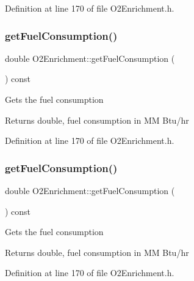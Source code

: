 Definition at line 170 of file O2\+Enrichment.\+h.

\mbox{\label{class_o2_enrichment_a48d73aca893ac689880b1d10faa399a5}} 
\subsubsection{\texorpdfstring{get\+Fuel\+Consumption()}{getFuelConsumption()}\hspace{0.1cm}{\footnotesize\ttfamily [2/3]}}
{\footnotesize\ttfamily double O2\+Enrichment\+::get\+Fuel\+Consumption (\begin{DoxyParamCaption}{ }\end{DoxyParamCaption}) const\hspace{0.3cm}{\ttfamily [inline]}}

Gets the fuel consumption \begin{DoxyReturn}{Returns}
double, fuel consumption in MM Btu/hr 
\end{DoxyReturn}


Definition at line 170 of file O2\+Enrichment.\+h.

\mbox{\label{class_o2_enrichment_a48d73aca893ac689880b1d10faa399a5}} 
\subsubsection{\texorpdfstring{get\+Fuel\+Consumption()}{getFuelConsumption()}\hspace{0.1cm}{\footnotesize\ttfamily [3/3]}}
{\footnotesize\ttfamily double O2\+Enrichment\+::get\+Fuel\+Consumption (\begin{DoxyParamCaption}{ }\end{DoxyParamCaption}) const\hspace{0.3cm}{\ttfamily [inline]}}

Gets the fuel consumption \begin{DoxyReturn}{Returns}
double, fuel consumption in MM Btu/hr 
\end{DoxyReturn}


Definition at line 170 of file O2\+Enrichment.\+h.

